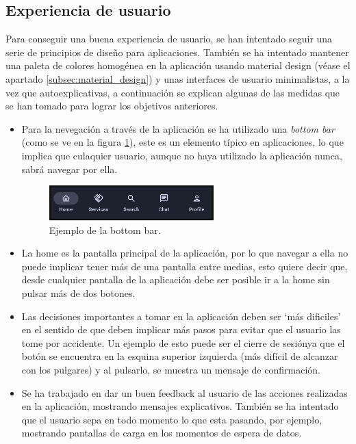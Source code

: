 \subsection{Experiencia de usuario}
Para conseguir una buena experiencia de usuario, se han intentado seguir una serie de principios de diseño para aplicaciones. También se ha intentado mantener una paleta de colores homogénea en la aplicación usando material design (véase el apartado \ref{subsec:material_design}) y  unas interfaces de usuario minimalistas, a la vez que autoexplicativas, a continuación se explican algunas de las medidas que se han tomado para lograr los objetivos anteriores.
\begin{itemize}
    \item Para la nevegación a través de la aplicación se ha utilizado una \textit{bottom bar} (como se ve en la figura \ref{fig:ejemplo_bottombar}), este es un elemento típico en aplicaciones, lo que implica que culaquier usuario, aunque no haya utilizado la aplicación nunca, sabrá navegar por ella.
    \begin{figure}[h]
        \centering
        \includegraphics[width = 0.6\textwidth]{Imagenes/Fuentes/ejemplo_bottombar.png}
        \caption{Ejemplo de la bottom bar.}
        \label{fig:ejemplo_bottombar}
    \end{figure}
    \item La home es la pantalla principal de la aplicación, por lo que navegar a ella no puede implicar tener más de una pantalla entre medias, esto quiere decir que, desde cualquier pantalla de la aplicación debe ser posible ir a la home sin pulsar más de dos botones. 
    \item Las decisiones importantes a tomar en la aplicación deben ser ‘más dificiles’ en el sentido de que deben implicar más pasos para evitar que el usuario las tome por accidente. Un ejemplo de esto puede ser el cierre de sesiónya que el botón se encuentra en la esquina superior izquierda (más difícil de alcanzar con los pulgares) y al pulsarlo, se muestra un mensaje de confirmación. 
    \item Se ha trabajado en dar un buen feedback al usuario de las acciones realizadas en la aplicación, mostrando mensajes explicativos. También se ha intentado que el usuario sepa en todo momento lo que esta pasando, por ejemplo, mostrando pantallas de carga en los momentos de espera de datos. 
\end{itemize}

